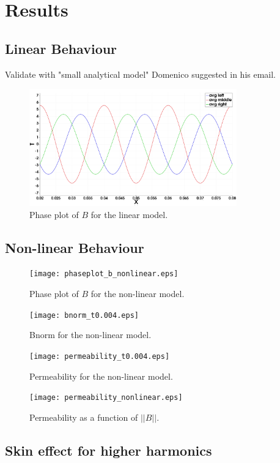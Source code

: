 \chapter{Results} \label{sec:results}

\section{Linear Behaviour}
Validate with "small analytical model" Domenico suggested in his email.

\begin{figure}[ht!]
    \centering
    \includegraphics[width=0.8\textwidth]{img/B_phase_plot_linear_mu.png}
    \caption{Phase plot of $B$ for the linear model.}
    \label{fig:linear_model}
\end{figure}


\section{Non-linear Behaviour}


\begin{figure}[t]
    \centering
    \texttt{[image: phaseplot\_b\_nonlinear.eps]}
    \caption{Phase plot of $B$ for the non-linear model.}
    \label{fig:nonlinear_phaseplot}
\end{figure}



\begin{figure}[t]
    \centering
    \texttt{[image: bnorm\_t0.004.eps]}
    \caption{Bnorm for the non-linear model.}
    \label{fig:nonlinear_bnorm}
\end{figure}


\begin{figure}[t]
    \centering
    \texttt{[image: permeability\_t0.004.eps]}
    \caption{Permeability for the non-linear model.}
    \label{fig:nonlinear_permeability}
\end{figure}


\begin{figure}[t]
    \centering
    \texttt{[image: permeability\_nonlinear.eps]}
    \caption{Permeability as a function of $||B||$.}
    \label{fig:nonlinear_permeability_bnorm}
\end{figure}

\section{Skin effect for higher harmonics}




